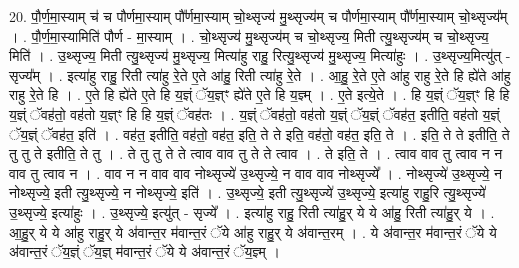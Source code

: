 \documentclass[17pt]{extarticle}
\begin{document}
20. पौ॒र्ण॒मा॒स्याम् च॑ च पौर्णमा॒स्याम् पौ᳚र्णमा॒स्याम् चो॒थ्सृज्य॑ मु॒थ्सृज्य॑म् च पौर्णमा॒स्याम् पौ᳚र्णमा॒स्याम् चो॒थ्सृज्य᳚म् । . पौ॒र्ण॒मा॒स्यामिति॑ पौर्ण - मा॒स्याम् । . चो॒थ्सृज्य॑ मु॒थ्सृज्य॑म् च चो॒थ्सृज्य॒ मिती त्यु॒थ्सृज्य॑म् च चो॒थ्सृज्य॒ मिति॑ । . उ॒थ्सृज्य॒ मिती त्यु॒थ्सृज्य॑ मु॒थ्सृज्य॒ मित्या॑हु राहु॒ रित्यु॒थ्सृज्य॑ मु॒थ्सृज्य॒ मित्या॑हुः । . उ॒थ्सृज्य॒मित्यु॑त् - सृज्य᳚म् । . इत्या॑हु राहु॒ रिती त्या॑हु रे॒ते ए॒ते आ॑हु॒ रिती त्या॑हु रे॒ते । . आ॒हु॒ रे॒ते ए॒ते आ॑हु राहु रे॒ते हि ह्ये॑ते आ॑हु राहु रे॒ते हि । . ए॒ते हि ह्ये॑ते ए॒ते हि य॒ज्ञ्ं ॅय॒ज्ञ्ꣳ ह्ये॑ते ए॒ते हि य॒ज्ञ्म् । . ए॒ते इत्ये॒ते । . हि य॒ज्ञ्ं ॅय॒ज्ञ्ꣳ हि हि य॒ज्ञ्ं ॅवह॑तो॒ वह॑तो य॒ज्ञ्ꣳ हि हि य॒ज्ञ्ं ॅवह॑तः । . य॒ज्ञ्ं ॅवह॑तो॒ वह॑तो य॒ज्ञ्ं ॅय॒ज्ञ्ं ॅवह॑त॒ इतीति॒ वह॑तो य॒ज्ञ्ं ॅय॒ज्ञ्ं ॅवह॑त॒ इति॑ । . वह॑त॒ इतीति॒ वह॑तो॒ वह॑त॒ इति॒ ते ते इति॒ वह॑तो॒ वह॑त॒ इति॒ ते । . इति॒ ते ते इतीति॒ ते तु तु ते इतीति॒ ते तु । . ते तु तु ते ते त्वाव वाव तु ते ते त्वाव । . ते इति॒ ते । . त्वाव वाव तु त्वाव न न वाव तु त्वाव न । . वाव न न वाव वाव नोथ्सृज्ये॑ उ॒थ्सृज्ये॒ न वाव वाव नोथ्सृज्ये᳚ । . नोथ्सृज्ये॑ उ॒थ्सृज्ये॒ न नोथ्सृज्ये॒ इती त्यु॒थ्सृज्ये॒ न नोथ्सृज्ये॒ इति॑ । . उ॒थ्सृज्ये॒ इती त्यु॒थ्सृज्ये॑ उ॒थ्सृज्ये॒ इत्या॑हु राहु॒रि त्यु॒थ्सृज्ये॑ उ॒थ्सृज्ये॒ इत्या॑हुः । . उ॒थ्सृज्ये॒ इत्यु॑त् - सृज्ये᳚ । . इत्या॑हु राहु॒ रिती त्या॑हु॒र् ये ये आ॑हु॒ रिती त्या॑हु॒र् ये । . आ॒हु॒र् ये ये आ॑हु राहु॒र् ये अ॑वान्त॒र म॑वान्त॒रं ॅये आ॑हु राहु॒र् ये अ॑वान्त॒रम् । . ये अ॑वान्त॒र म॑वान्त॒रं ॅये ये अ॑वान्त॒रं ॅय॒ज्ञ्ं ॅय॒ज्ञ् म॑वान्त॒रं ॅये ये अ॑वान्त॒रं ॅय॒ज्ञ्म् । \newline
\end{document}
